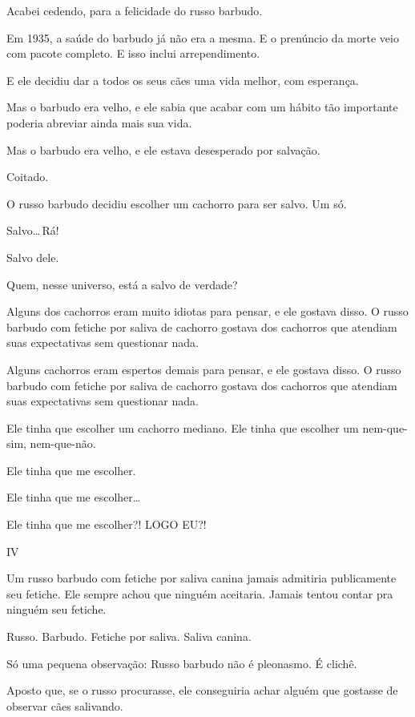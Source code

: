\enlargethispage{\baselineskip}

Acabei cedendo, para a felicidade do russo barbudo.

Em 1935, a saúde do barbudo já não era a mesma. E o prenúncio da morte veio com pacote completo. E isso inclui arrependimento.

E ele decidiu dar a todos os seus cães uma vida melhor, com esperança.

Mas o barbudo era velho, e ele sabia que acabar com um hábito tão importante poderia abreviar ainda mais sua vida.

Mas o barbudo era velho, e ele estava desesperado por salvação.

Coitado.

O russo barbudo decidiu escolher um cachorro para ser salvo. Um só.

Salvo\ldots\,Rá!

Salvo dele.

Quem, nesse universo, está a salvo de verdade?

Alguns dos cachorros eram muito idiotas para pensar, e ele gostava disso. O russo barbudo com fetiche por saliva de cachorro gostava dos cachorros que atendiam suas expectativas sem questionar nada.

Alguns cachorros eram espertos demais para pensar, e ele gostava disso. O russo barbudo com fetiche por saliva de cachorro gostava dos cachorros que atendiam suas expectativas sem questionar nada.

Ele tinha que escolher um cachorro mediano. Ele tinha que escolher um nem-que-sim, nem-que-não.

Ele tinha que me escolher.

Ele tinha que me escolher\ldots

Ele tinha que me escolher?! LOGO EU?!

\newpage
\begin{center}
{\Large IV}
\end{center}

Um russo barbudo com fetiche por saliva canina jamais admitiria publicamente seu fetiche. Ele sempre achou que ninguém aceitaria. Jamais tentou contar pra ninguém seu fetiche.

Russo. Barbudo. Fetiche por saliva. Saliva canina.

Só uma pequena observação: Russo barbudo não é pleonasmo. É clichê.

Aposto que, se o russo procurasse, ele conseguiria achar alguém que gostasse de observar cães salivando.

